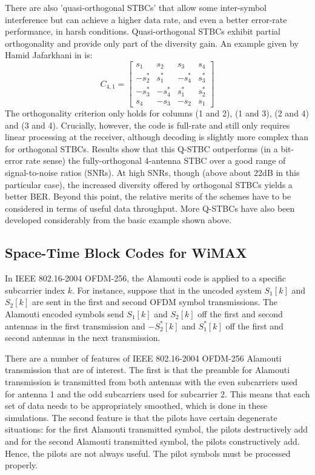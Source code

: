 There are also 'quasi-orthogonal STBCs' that allow some inter-symbol
interference but can achieve a higher data rate, and even a better
error-rate performance, in harsh conditions. Quasi-orthogonal STBCs
exhibit partial orthogonality and provide only part of the diversity
gain. An example given by Hamid Jafarkhani in \cite{20} is:
\[
C_{4,1}=\left[\begin{array}{cccc}
s_1 & s_2 & s_3 & s_4\\
-s^*_2 & s^*_1 & -s^*_4 & s^*_3\\
-s^*_3 & -s^*_4 & s^*_1 & s^*_2\\
s_4 & -s_3 & -s_2 & s_1
\end{array} \right]
\]
The orthogonality criterion only holds for columns (1 and 2), (1 and
3), (2 and 4) and (3 and 4). Crucially, however, the code is
full-rate and still only requires linear processing at the receiver,
although decoding is slightly more complex than for orthogonal
STBCs. Results show that this Q-STBC outperforms (in a bit-error
rate sense) the fully-orthogonal 4-antenna STBC over a good range of
signal-to-noise ratios (SNRs). At high SNRs, though (above about
22dB in this particular case), the increased diversity offered by
orthogonal STBCs yields a better BER. Beyond this point, the
relative merits of the schemes have to be considered in terms of
useful data throughput. More Q-STBCs have also been developed
considerably from the basic example shown above.
\subsection{Space-Time Block Codes for WiMAX}
In IEEE 802.16-2004 OFDM-256, the Alamouti code is applied to a
specific subcarrier index $k$. For instance, suppose that in the
uncoded system $S_1[k]$ and $S_2[k]$ are sent in the first and
second OFDM symbol transmissions.  The Alamouti encoded symbols send
$S_1[k]$ and $S_2[k]$ off the first and second antennas in the first
transmission and $-S_2^*[k]$ and $S_1^*[k]$ off the first and second
antennas in the next transmission.

There are a number of features of IEEE 802.16-2004 OFDM-256 Alamouti
transmission that are of interest.  The first is that the preamble
for Alamouti transmission is transmitted from both antennas with the
even subcarriers used for antenna 1 and the odd subcarriers used for
subcarrier 2. This means that each set of data needs to be
appropriately smoothed, which is done in these simulations. The
second feature is that the pilots have certain degenerate
situations: for the first Alamouti transmitted symbol, the pilots
destructively add and for the second Alamouti transmitted symbol,
the pilots constructively add. Hence, the pilots are not always
useful. The pilot symbols must be processed properly.

